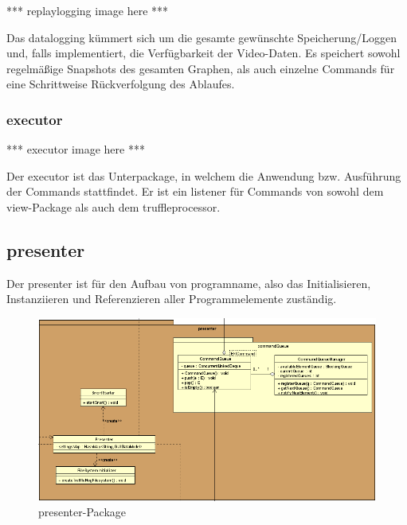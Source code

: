     *** replaylogging image here ***
    \newline
    \newline

    Das datalogging kümmert sich um die gesamte gewünschte
    Speicherung/Loggen und, falls implementiert, die Verfügbarkeit der
    Video-Daten. Es speichert sowohl regelmäßige Snapshots des gesamten
    Graphen, als auch einzelne Commands für eine Schrittweise Rückverfolgung
    des Ablaufes.

    \subsubsection{executor}
    \label{subsubsec:executor}

    *** executor image here ***
    \newline
    \newline

    Der executor ist das Unterpackage, in welchem die Anwendung bzw.
    Ausführung der Commands stattfindet. Er ist ein \gls{listener} für Commands
    von sowohl dem view-Package als auch dem truffleprocessor.


\subsection{presenter}
\label{subsec:presenter}

Der presenter ist für den Aufbau von \gls{programname}, also das
Initialisieren, Instanziieren und Referenzieren aller Programmelemente zuständig.

\begin{figure}[H]
  \centering
  \includegraphics[width=\textwidth]{../diagramimages/presenter.png}
  \caption{presenter-Package}
\end{figure}

